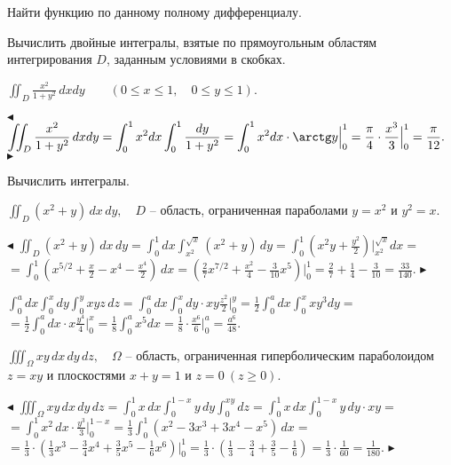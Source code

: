 \documentclass[a5paper,10pt]{article}
\begin{document}
\medskip\noindent
Найти функцию по данному полному дифференциалу.

\medskip
\noindent Вычислить двойные интегралы, взятые по прямоугольным областям интегрирования $D$, заданным условиями в скобках.

\medskip\noindent
{} $\displaystyle \iint_D\frac{x^2}{1+y^2}\,dxdy\qquad (0\le x \le1,\quad 0\le y\le 1)$.

\smallskip
\noindent $\blacktriangleleft$ $\displaystyle \iint_D\frac{x^2}{1+y^2}\,dxdy=\int_0^1x^2dx\int_0^1\frac{dy}{1+y^2}=
\int_0^1x^2dx\cdot\arctg y\Big|_0^1=\frac{\pi}{4}\cdot\frac{x^3}{3}\Big|_0^1=\frac{\pi}{12}.$
$\blacktriangleright$

\medskip\noindent
Вычислить интегралы.

\medskip
{} $\displaystyle \iint_D(x^2+y)\,dx\,dy,\quad D$ -- область, ограниченная параболами
$y=x^2$ и $y^2=x$.

\smallskip
\noindent $\blacktriangleleft$ $\displaystyle \iint_D(x^2+y)\,dx\,dy=
\int_0^1dx\int_{x^2}^{\sqrt x}(x^2+y)\,dy=
\int_0^1\left(x^2y+\frac{y^2}{2}\right)\Big|_{x^2}^{\sqrt x}dx=$\\
$\displaystyle =\int_0^1\left(x^{5/2}+\frac{x}{2}-x^4-\frac{x^4}{2}\right)\,dx
=\left(\frac27x^{7/2}+\frac{x^2}{4}-\frac{3}{10}x^5\right)\Big|_0^1
=\frac27+\frac{1}{4}-\frac{3}{10}=\frac{33}{140}.$ $\blacktriangleright$

\medskip
{} $\displaystyle \int_0^a dx\int_0^x dy\int_0^y xyz\,dz=
\int_0^a dx\int_0^x dy\cdot xy\frac{z^2}{2}\Big|_0^y=\frac12\int_0^a dx\int_0^xxy^3dy=$\\
$\displaystyle =\frac12\int_0^a dx\cdot x\frac{y^4}{4}\Big|_0^x=\frac18\int_0^a x^5 dx=
\frac18\cdot\frac{x^6}{6}\Big|_0^a=\frac{a^6}{48}$.

\medskip
{} $\displaystyle \iiint_\Omega xy\,dx\,dy\,dz,\quad\Omega$ -- область, ограниченная
гиперболическим параболоидом $z=xy$ и плоскостями $x+y=1$ и $z=0\ (z\ge0)$.

\smallskip\noindent $\blacktriangleleft$ $\displaystyle \iiint_\Omega xy\,dx\,dy\,dz=
\int_0^1x\,dx\int_0^{1-x}y\,dy\int_0^{xy}dz=\int_0^1x\,dx\int_0^{1-x}y\,dy\cdot xy=$\\
$\displaystyle =\int_0^1x^2\,dx\cdot\frac{y^3}{3}\Big|_0^{1-x}=\frac13\int_0^1(x^2-3x^3+3x^4-x^5)\,dx=$\\
$\displaystyle =\frac13\cdot\left(\frac13x^3-\frac34x^4+\frac35x^5-\frac16x^6\right)\Big|_0^1=
\frac13\cdot\left(\frac13-\frac34+\frac35-\frac16\right)=\frac13\cdot\frac{1}{60}=\frac{1}{180}$.
$\blacktriangleright$
\end{document}
